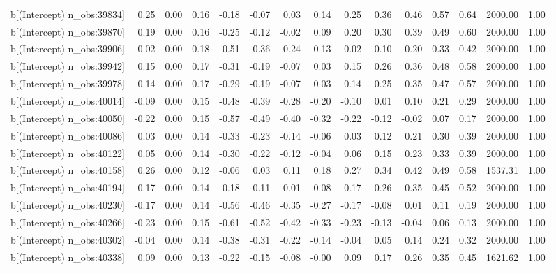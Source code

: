 \begin{table}[ht]
\begin{tabular}{rrrrrrrrrrrrrrr}
  b[(Intercept) n\_obs:39834] & 0.25 & 0.00 & 0.16 & -0.18 & -0.07 & 0.03 & 0.14 & 0.25 & 0.36 & 0.46 & 0.57 & 0.64 & 2000.00 & 1.00 \\ 
  b[(Intercept) n\_obs:39870] & 0.19 & 0.00 & 0.16 & -0.25 & -0.12 & -0.02 & 0.09 & 0.20 & 0.30 & 0.39 & 0.49 & 0.60 & 2000.00 & 1.00 \\ 
  b[(Intercept) n\_obs:39906] & -0.02 & 0.00 & 0.18 & -0.51 & -0.36 & -0.24 & -0.13 & -0.02 & 0.10 & 0.20 & 0.33 & 0.42 & 2000.00 & 1.00 \\ 
  b[(Intercept) n\_obs:39942] & 0.15 & 0.00 & 0.17 & -0.31 & -0.19 & -0.07 & 0.03 & 0.15 & 0.26 & 0.36 & 0.48 & 0.58 & 2000.00 & 1.00 \\ 
  b[(Intercept) n\_obs:39978] & 0.14 & 0.00 & 0.17 & -0.29 & -0.19 & -0.07 & 0.03 & 0.14 & 0.25 & 0.35 & 0.47 & 0.57 & 2000.00 & 1.00 \\ 
  b[(Intercept) n\_obs:40014] & -0.09 & 0.00 & 0.15 & -0.48 & -0.39 & -0.28 & -0.20 & -0.10 & 0.01 & 0.10 & 0.21 & 0.29 & 2000.00 & 1.00 \\ 
  b[(Intercept) n\_obs:40050] & -0.22 & 0.00 & 0.15 & -0.57 & -0.49 & -0.40 & -0.32 & -0.22 & -0.12 & -0.02 & 0.07 & 0.17 & 2000.00 & 1.00 \\ 
  b[(Intercept) n\_obs:40086] & 0.03 & 0.00 & 0.14 & -0.33 & -0.23 & -0.14 & -0.06 & 0.03 & 0.12 & 0.21 & 0.30 & 0.39 & 2000.00 & 1.00 \\ 
  b[(Intercept) n\_obs:40122] & 0.05 & 0.00 & 0.14 & -0.30 & -0.22 & -0.12 & -0.04 & 0.06 & 0.15 & 0.23 & 0.33 & 0.39 & 2000.00 & 1.00 \\ 
  b[(Intercept) n\_obs:40158] & 0.26 & 0.00 & 0.12 & -0.06 & 0.03 & 0.11 & 0.18 & 0.27 & 0.34 & 0.42 & 0.49 & 0.58 & 1537.31 & 1.00 \\ 
  b[(Intercept) n\_obs:40194] & 0.17 & 0.00 & 0.14 & -0.18 & -0.11 & -0.01 & 0.08 & 0.17 & 0.26 & 0.35 & 0.45 & 0.52 & 2000.00 & 1.00 \\ 
  b[(Intercept) n\_obs:40230] & -0.17 & 0.00 & 0.14 & -0.56 & -0.46 & -0.35 & -0.27 & -0.17 & -0.08 & 0.01 & 0.11 & 0.19 & 2000.00 & 1.00 \\ 
  b[(Intercept) n\_obs:40266] & -0.23 & 0.00 & 0.15 & -0.61 & -0.52 & -0.42 & -0.33 & -0.23 & -0.13 & -0.04 & 0.06 & 0.13 & 2000.00 & 1.00 \\ 
  b[(Intercept) n\_obs:40302] & -0.04 & 0.00 & 0.14 & -0.38 & -0.31 & -0.22 & -0.14 & -0.04 & 0.05 & 0.14 & 0.24 & 0.32 & 2000.00 & 1.00 \\ 
  b[(Intercept) n\_obs:40338] & 0.09 & 0.00 & 0.13 & -0.22 & -0.15 & -0.08 & -0.00 & 0.09 & 0.17 & 0.26 & 0.35 & 0.45 & 1621.62 & 1.00 \\ 

\end{tabular}
\end{table}

